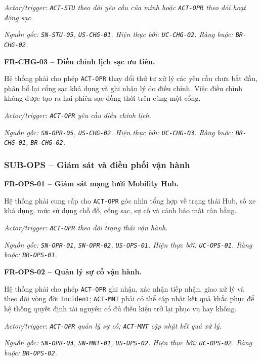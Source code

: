 \textit{Actor/trigger: \texttt{ACT-STU} theo dõi yêu cầu của mình hoặc \texttt{ACT-OPR} theo dõi hoạt động sạc.}\par
\textit{Nguồn gốc: \texttt{SN-STU-05}, \texttt{US-CHG-01}. Hiện thực bởi: \texttt{UC-CHG-02}. Ràng buộc: \texttt{BR-CHG-02}.}

\medskip
\noindent\textbf{FR-CHG-03 -- Điều chỉnh lịch sạc ưu tiên.}\par
\nopagebreak[4]
Hệ thống phải cho phép \texttt{ACT-OPR} thay đổi thứ tự xử lý các yêu cầu chưa bắt đầu, phân bổ lại cổng sạc khả dụng và ghi nhận lý do điều chỉnh. Việc điều chỉnh không được tạo ra hai phiên sạc đồng thời trên cùng một cổng.

\textit{Actor/trigger: \texttt{ACT-OPR} yêu cầu điều chỉnh lịch.}\par
\textit{Nguồn gốc: \texttt{SN-OPR-05}, \texttt{US-CHG-02}. Hiện thực bởi: \texttt{UC-CHG-03}. Ràng buộc: \texttt{BR-CHG-01}, \texttt{BR-CHG-02}.}

\subsubsection{SUB-OPS -- Giám sát và điều phối vận hành}

\noindent\textbf{FR-OPS-01 -- Giám sát mạng lưới Mobility Hub.}\par
\nopagebreak[4]
Hệ thống phải cung cấp cho \texttt{ACT-OPR} góc nhìn tổng hợp về trạng thái Hub, số xe khả dụng, mức sử dụng chỗ đỗ, cổng sạc, sự cố và cảnh báo mất cân bằng.

\textit{Actor/trigger: \texttt{ACT-OPR} theo dõi trạng thái vận hành.}\par
\textit{Nguồn gốc: \texttt{SN-OPR-01}, \texttt{SN-OPR-02}, \texttt{US-OPS-01}. Hiện thực bởi: \texttt{UC-OPS-01}. Ràng buộc: \texttt{BR-OPS-01}.}

\medskip
\noindent\textbf{FR-OPS-02 -- Quản lý sự cố vận hành.}\par
\nopagebreak[4]
Hệ thống phải cho phép \texttt{ACT-OPR} ghi nhận, xác nhận tiếp nhận, giao xử lý và theo dõi vòng đời \texttt{Incident}; \texttt{ACT-MNT} phải có thể cập nhật kết quả khắc phục để hệ thống quyết định tài nguyên có đủ điều kiện trở lại phục vụ hay không.

\textit{Actor/trigger: \texttt{ACT-OPR} quản lý sự cố; \texttt{ACT-MNT} cập nhật kết quả xử lý.}\par
\textit{Nguồn gốc: \texttt{SN-OPR-03}, \texttt{SN-MNT-01}, \texttt{US-OPS-02}. Hiện thực bởi: \texttt{UC-OPS-02}. Ràng buộc: \texttt{BR-OPS-02}.}

